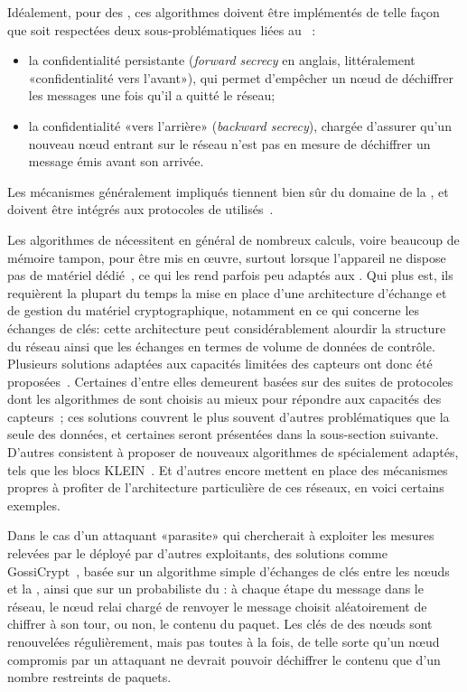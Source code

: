 Idéalement, pour des \rcs, ces algorithmes doivent être implémentés de telle façon que soit respectées deux sous-problématiques liées au ~\cite{LG08}:
\begin{itemize}
    \item la confidentialité persistante (\textit{forward secrecy} en anglais, littéralement «confidentialité vers l'avant»), qui permet d'empêcher un nœud de déchiffrer les messages une fois qu'il a quitté le réseau;
    \item la confidentialité «vers l'arrière» (\textit{backward secrecy}), chargée d'assurer qu'un nouveau nœud entrant sur le réseau n'est pas en mesure de déchiffrer un message émis avant son arrivée.
\end{itemize}
Les mécanismes généralement impliqués tiennent bien sûr du domaine de la , et doivent être intégrés aux protocoles de \secu utilisés~\cite{DSK10}.

Les algorithmes de  nécessitent en général de nombreux calculs, voire beaucoup de mémoire tampon, pour être mis en œuvre, surtout lorsque l'appareil ne dispose pas de matériel dédié~\cite{PLP06}, ce qui les rend parfois peu adaptés aux \rcs.
Qui plus est, ils requièrent la plupart du temps la mise en place d'une architecture d'échange et de gestion du matériel cryptographique, notamment en ce qui concerne les échanges de clés: cette architecture peut considérablement alourdir la structure du réseau ainsi que les échanges en termes de volume de données de contrôle.
Plusieurs solutions adaptées aux capacités limitées des capteurs ont donc été proposées~\cite{OX09}.
Certaines d'entre elles demeurent basées sur des suites de protocoles dont les algorithmes de  sont choisis au mieux pour répondre aux capacités des capteurs~\cite{SOBMCN11,KR12}; ces solutions couvrent le plus souvent d'autres problématiques que la seule  des données, et certaines seront présentées dans la sous-section suivante.
D'autres consistent à proposer de nouveaux algorithmes de  spécialement adaptés, tels que les blocs KLEIN~\cite{GNL12}.
Et d'autres encore mettent en place des mécanismes propres à profiter de l'architecture particulière de ces réseaux, en voici certains exemples.

Dans le cas d'un attaquant «parasite» qui chercherait à exploiter les mesures relevées par le \rc déployé par d'autres exploitants, des solutions comme GossiCrypt~\cite{LPH08}, basée sur un algorithme simple d'échanges de clés entre les nœuds et la \sdb, ainsi que sur un  probabiliste du : à chaque étape du message dans le réseau, le nœud relai chargé de renvoyer le message choisit aléatoirement de chiffrer à son tour, ou non, le contenu du paquet.
Les clés de  des nœuds sont renouvelées régulièrement, mais pas toutes à la fois, de telle sorte qu'un nœud compromis par un attaquant ne devrait pouvoir déchiffrer le contenu que d'un nombre restreints de paquets.

